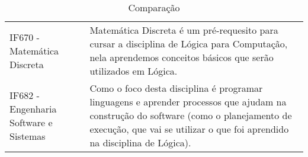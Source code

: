 \documentclass[10pt]{article}
\begin{document}
\begin{table}[h]
 \centering
 {\renewcommand\arraystretch{1.25}
 \caption{Comparação}
 \begin{tabular}{ l l }
  \cline{1-1}\cline{2-2}  
   
  \\  
  \cline{1-1}\cline{2-2}  
    \multicolumn{1}{|p{3.850cm}|}{IF670 - Matemática Discreta} &
    \multicolumn{1}{p{4.217cm}|}{Matemática Discreta é um pré-requesito para cursar a disciplina de Lógica para Computação, nela aprendemos conceitos básicos que serão utilizados em Lógica.  \citep{matematica}}
  \\  
  \cline{1-1}\cline{2-2}  
    \multicolumn{1}{|p{3.850cm}|}{IF682 - Engenharia Software e Sistemas } &
    \multicolumn{1}{p{4.217cm}|}{Como o foco desta disciplina é programar linguagens e aprender processos que ajudam na construção do software (como o planejamento de execução, que vai se utilizar o que foi aprendido na disciplina de Lógica). \citep{eng}}
  \\  
  \hline

 \end{tabular} }
\end{table}



\end{document}
